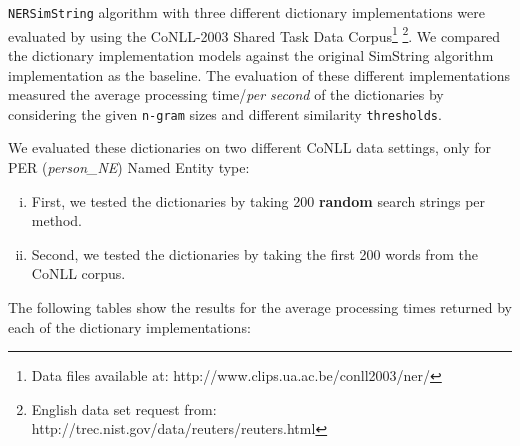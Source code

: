 \texttt{NERSimString} algorithm with three different dictionary implementations were evaluated by using the CoNLL-2003 Shared Task Data Corpus\footnote{Data files available at: http://www.clips.ua.ac.be/conll2003/ner/} \footnote{English data set request from: http://trec.nist.gov/data/reuters/reuters.html}. We compared the dictionary implementation models against the original SimString algorithm implementation as the baseline. The evaluation of these different implementations measured the average processing time\//\textit{per second} of the dictionaries by considering the given \texttt{n-gram} sizes and different similarity \texttt{thresholds}.

We evaluated these dictionaries on two different CoNLL data settings, only for PER (\textit{person\_NE}) Named Entity type:
\begin{enumerate}[i.]
	\item First, we tested the dictionaries by taking 200 \textbf{random} search strings per method.
	\item Second, we tested the dictionaries by taking the first 200 words from the CoNLL corpus.
\end{enumerate}

The following tables show the results for the average processing times returned by each of the dictionary implementations:

\begin{center}

\begin{table}[H]
  \caption{Average Look-up Time Results Based on 200 Random Strings}
  \end{table}
  
\end{center}

